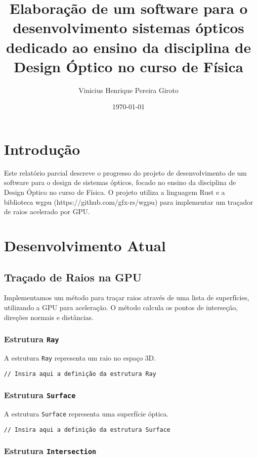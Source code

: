 \documentclass[a4paper,brazilian,12pt]{article}
\title{Elaboração de um software para o desenvolvimento sistemas ópticos dedicado ao ensino da disciplina de Design Óptico no curso de Física}
\author{Vinicius Henrique Pereira Giroto}
\date{\today}
\begin{document}
\maketitle

\section{Introdução}

Este relatório parcial descreve o progresso do projeto de desenvolvimento de um software para o design de sistemas ópticos, focado no ensino da disciplina de Design Óptico no curso de Física. O projeto utiliza a linguagem Rust e a biblioteca wgpu (https://github.com/gfx-rs/wgpu) para implementar um traçador de raios acelerado por GPU.

\section{Desenvolvimento Atual}

\subsection{Traçado de Raios na GPU}

Implementamos um método para traçar raios através de uma lista de superfícies, utilizando a GPU para aceleração. O método calcula os pontos de interseção, direções normais e distâncias.

\subsubsection{Estrutura \texttt{Ray}}

A estrutura \texttt{Ray} representa um raio no espaço 3D.

\begin{verbatim}
// Insira aqui a definição da estrutura Ray
\end{verbatim}

\subsubsection{Estrutura \texttt{Surface}}

A estrutura \texttt{Surface} representa uma superfície óptica.

\begin{verbatim}
// Insira aqui a definição da estrutura Surface
\end{verbatim}

\subsubsection{Estrutura \texttt{Intersection}}
\end{document}

